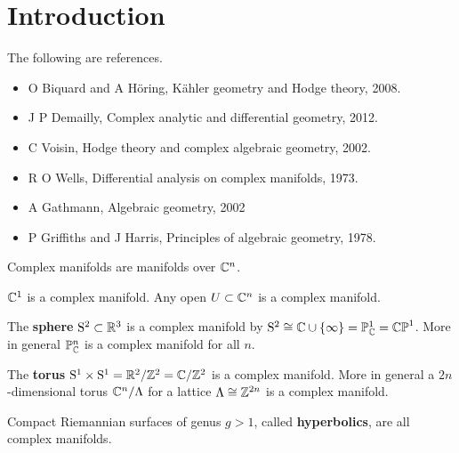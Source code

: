 





\setcounter{section}{0}

\section{Introduction}


The following are references.
\begin{itemize}
\item O Biquard and A H\"oring, K\"ahler geometry and Hodge theory, 2008.
\item J P Demailly, Complex analytic and differential geometry, 2012.
\item C Voisin, Hodge theory and complex algebraic geometry, 2002.
\item R O Wells, Differential analysis on complex manifolds, 1973.
\item A Gathmann, Algebraic geometry, 2002
\item P Griffiths and J Harris, Principles of algebraic geometry, 1978.
\end{itemize}

Complex manifolds are manifolds over $ \mathbb{C}^n $.

\begin{example}
$ \mathbb{C}^1 $ is a complex manifold. Any open $ U \subset \mathbb{C}^n $ is a complex manifold.
\end{example}

\begin{example}
The \textbf{sphere} $ \mathrm{S}^2 \subset \mathbb{R}^3 $ is a complex manifold by $ \S^2 \cong \CC \cup \cbr{\infty} = \PP_\CC^1 = \CP^1 $. More in general $ \mathbb{P}_{\mathbb{C}}^n $ is a complex manifold for all $ n $.
\end{example}

\begin{example}
The \textbf{torus} $ \mathrm{S}^1 \times \mathrm{S}^1 = \mathbb{R}^2 / \mathbb{Z}^2 = \mathbb{C} / \mathbb{Z}^2 $ is a complex manifold. More in general a $ 2n $-dimensional torus $ \mathbb{C}^n / \Lambda $ for a lattice $ \Lambda \cong \mathbb{Z}^{2n} $ is a complex manifold.
\end{example}

\begin{example}
Compact Riemannian surfaces of genus $ g > 1 $, called \textbf{hyperbolics}, are all complex manifolds.
\end{example}

